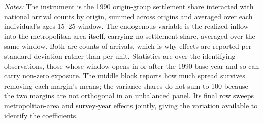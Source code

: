 \begin{table}[!htbp]
\centering
\caption{Distribution of Immigrant Exposure and of the Realized Inflow}
\label{tab:exposure_distribution}
\begin{minipage}{\textwidth}
\footnotesize
\vspace{4pt}
\textit{Notes:} The instrument is the 1990 origin-group settlement share interacted with national arrival counts by origin, summed across origins and averaged over each individual's ages 15--25 window. The endogenous variable is the realized inflow into the metropolitan area itself, carrying no settlement share, averaged over the same window. Both are counts of arrivals, which is why effects are reported per standard deviation rather than per unit. Statistics are over the identifying observations, those whose window opens in or after the 1990 base year and so can carry non-zero exposure. The middle block reports how much spread survives removing each margin's means; the variance shares do not sum to 100 because the two margins are not orthogonal in an unbalanced panel. Its final row sweeps metropolitan-area and survey-year effects jointly, giving the variation available to identify the coefficients.
\end{minipage}
\end{table}

